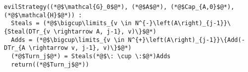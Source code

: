 {}
\begin{lstlisting}[label=evilstrategy]
evilStrategy((*@$\mathcal{G}_0$@*), (*@$A$@*), (*@$Cap_{A,0}$@*), (*@$\mathcal{H}$@*)) :
  Steals = (*@$\bigcup\limits_{v \in N^{-}\left(A\right)_{j-1}}\{Steal(DTr_{v \rightarrow A, j-1}, v)\}$@*)
  Adds = (*@$\bigcup\limits_{v \in N^{+}\left(A\right)_{j-1}}\{Add(-DTr_{A \rightarrow v, j-1}, v)\}$@*)
  (*@$Turn_j$@*) = Steals(*@$\: \cup \:$@*)Adds
  return((*@$Turn_j$@*))
\end{lstlisting}
